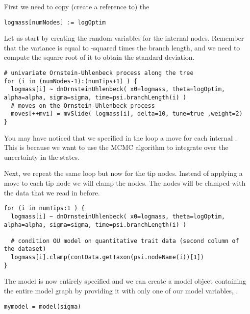 First we need to copy (create a reference to) the 
{\tt \small \begin{snugshade*}
\begin{lstlisting}
logmass[numNodes] := logOptim
\end{lstlisting}
\end{snugshade*}}
Let us start by creating the random variables for the internal nodes. Remember that the variance is equal to -squared times the branch length, and we need to compute the square root of it to obtain the standard deviation.
{\tt \small \begin{snugshade*}
\begin{lstlisting}
# univariate Ornstein-Uhlenbeck process along the tree
for (i in (numNodes-1):(numTips+1) ) {
  logmass[i] ~ dnOrnsteinUhlenbeck( x0=logmass, theta=logOptim, alpha=alpha, sigma=sigma, time=psi.branchLength(i) )
  # moves on the Ornstein-Uhlenbeck process
  moves[++mvi] = mvSlide( logmass[i], delta=10, tune=true ,weight=2) 
}
\end{lstlisting}
\end{snugshade*}}
You may have noticed that we specified in the loop a move for each internal . This is because we want to use the MCMC algorithm to integrate over the uncertainty in the states.

Next, we repeat the same loop but now for the tip nodes. Instead of applying a move to each tip node we will clamp the nodes. The nodes will be clamped with the data that we read in before.
{\tt \small \begin{snugshade*}
\begin{lstlisting}
for (i in numTips:1 ) {
  logmass[i] ~ dnOrnsteinUhlenbeck( x0=logmass, theta=logOptim, alpha=alpha, sigma=sigma, time=psi.branchLength(i) )

  # condition OU model on quantitative trait data (second column of the dataset)
  logmass[i].clamp(contData.getTaxon(psi.nodeName(i))[1])
}
\end{lstlisting}
\end{snugshade*}}

The model is now entirely specified and we can create a model object containing the entire model graph by providing it with only one of our model variables, \EG {}. 
{\tt \small \begin{snugshade*}
\begin{lstlisting}
mymodel = model(sigma)
\end{lstlisting}
\end{snugshade*}}

